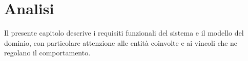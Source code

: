 \chapter{Analisi}
\label{chap:analisi}
Il presente capitolo descrive i requisiti funzionali del sistema e il modello del dominio, con particolare attenzione alle entità coinvolte e ai vincoli che ne regolano il comportamento.




